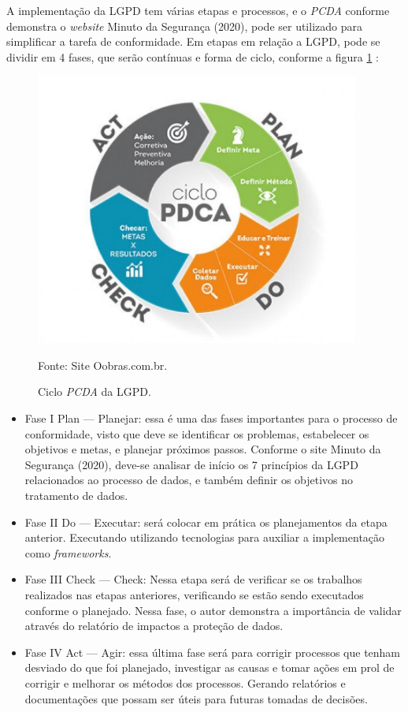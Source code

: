 \documentclass[
	12pt,				%
	openright,			%
	oneside,			%
	a4paper,			%
	english,			%
	french,				%
	spanish,			%
	brazil,				%
	]{abntex2}
\begin{document}
A implementação da LGPD tem várias etapas e processos, e o \textit{PCDA} conforme demonstra o \textit{website} Minuto da Segurança (2020), pode ser utilizado para simplificar a tarefa de conformidade. Em etapas em relação a LGPD, pode se dividir em 4 fases, que serão contínuas e forma de ciclo, conforme a figura \ref{fig: PCDA } :

\begin{figure}[ht]
    \centering
    \caption{Ciclo \textit{PCDA} da LGPD.}
    \includegraphics[width=4.2in]{Images/05PCDA.png}
    
    \label{fig: PCDA }
    \centering \small Fonte: Site Oobras.com.br.
\end{figure}

\begin{itemize}
\item Fase I  Plan — Planejar: essa é uma das fases importantes para o processo de conformidade, visto que deve se identificar os problemas, estabelecer os objetivos e metas, e planejar próximos passos. Conforme o site Minuto da Segurança (2020), deve-se analisar de início os 7 princípios da LGPD relacionados ao processo de dados, e também definir os objetivos no tratamento de dados.
\item Fase II Do — Executar: será colocar em prática os planejamentos da etapa anterior. Executando utilizando tecnologias para auxiliar a implementação como \textit{frameworks}.
\item Fase III Check — Check: Nessa etapa será de verificar se os trabalhos realizados nas etapas anteriores, verificando se estão sendo executados conforme o planejado. Nessa fase, o autor demonstra a importância de validar através do relatório de impactos a proteção de dados.
\item Fase IV Act — Agir:  essa última fase será para corrigir processos que tenham desviado do que foi planejado, investigar as causas e tomar ações em prol de corrigir e melhorar os métodos dos processos. Gerando relatórios e documentações que possam ser úteis para futuras tomadas de decisões.
\end{itemize}
\end{document}
